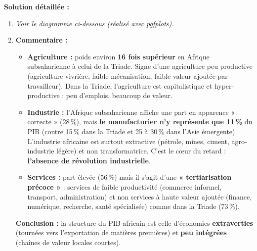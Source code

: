 \documentclass[11pt]{article}
\begin{document}
\begin{exoresolu}
\tcblower
\textbf{Solution détaillée :}
\begin{enumerate}
    \item \textit{Voir le diagramme ci-dessous (réalisé avec pgfplots).}
    \item \textbf{Commentaire :}
    \begin{itemize}
        \item \textbf{Agriculture :} poids environ \textbf{16 fois supérieur} en Afrique subsaharienne à celui de la Triade. Signe d'une agriculture peu productive (agriculture vivrière, faible mécanisation, faible valeur ajoutée par travailleur). Dans la Triade, l'agriculture est capitalistique et hyper-productive : peu d'emplois, beaucoup de valeur.
        \item \textbf{Industrie :} l'Afrique subsaharienne affiche une part en apparence « correcte » (28\,\%), mais \textbf{le manufacturier n'y représente que 11\,\%} du PIB (contre 15\,\% dans la Triade et 25 à 30\,\% dans l'Asie émergente). L'industrie africaine est surtout extractive (pétrole, mines, ciment, agro-industrie légère) et non transformatrice. C'est le cœur du retard : \textbf{l'absence de révolution industrielle}.
        \item \textbf{Services :} part élevée (56\,\%) mais il s'agit d'une \textbf{« tertiarisation précoce »} : services de faible productivité (commerce informel, transport, administration) et non services à haute valeur ajoutée (finance, numérique, recherche, santé spécialisée) comme dans la Triade (73\,\%).
    \end{itemize}
    \textbf{Conclusion :} la structure du PIB africain est celle d'économies \textbf{extraverties} (tournées vers l'exportation de matières premières) et \textbf{peu intégrées} (chaînes de valeur locales courtes).
\end{enumerate}
\end{exoresolu}
\end{document}
